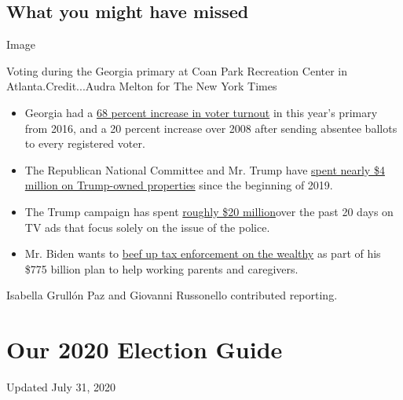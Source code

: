\hypertarget{what-you-might-have-missed}{%
\subsection{What you might have
missed}\label{what-you-might-have-missed}}

Image

Voting during the Georgia primary at Coan Park Recreation Center in
Atlanta.Credit...Audra Melton for The New York Times

\begin{itemize}
\item
  Georgia had a
  \href{https://www.nytimes.com/2020/07/21/us/politics/biden-2020.html}{68
  percent increase in voter turnout} in this year's primary from 2016,
  and a 20 percent increase over 2008 after sending absentee ballots to
  every registered voter.
\item
  The Republican National Committee and Mr. Trump have
  \href{https://www.nytimes.com/2020/07/21/us/politics/trump-tulsa-rally-cost.html}{spent
  nearly \$4 million on Trump-owned properties} since the beginning of
  2019.
\item
  The Trump campaign has spent
  \href{https://www.nytimes.com/2020/07/21/us/politics/trump-portland-federal-agents.html}{roughly
  \$20 million}over the past 20 days on TV ads that focus solely on the
  issue of the police.
\item
  Mr. Biden wants to
  \href{https://www.nytimes.com/2020/07/21/us/politics/biden-workplace-childcare.html}{beef
  up tax enforcement on the wealthy} as part of his \$775 billion plan
  to help working parents and caregivers.
\end{itemize}

Isabella Grullón Paz and Giovanni Russonello contributed reporting.

\hypertarget{our-2020-election-guide}{%
\section{Our 2020 Election Guide}\label{our-2020-election-guide}}

Updated July 31, 2020

